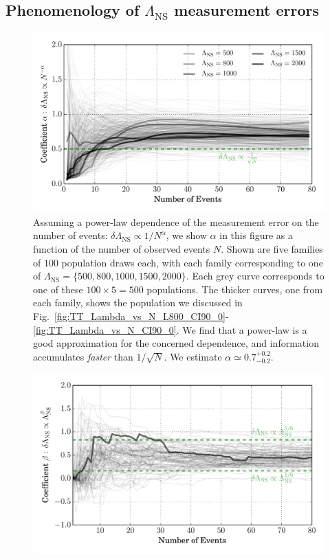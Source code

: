 \documentclass[aps,prd,amsmath,floats,floatfix, twocolumn,
superscriptaddress,nofootinbib,showpacs]{revtex4-1}
\newcommand{\lambdans}{\Lambda_\mathrm{NS}}
\begin{document}
\begin{appendix}
\section{Phenomenology of $\lambdans$ measurement errors}
% 
\begin{figure}
\centering    
\includegraphics[width=1.05\columnwidth]{PowerLawCoefficient_LambdaErrorvsN_vs_N.pdf}
\caption{%
Assuming a power-law dependence of the measurement error on the number of
events: $\delta\lambdans\propto 1/N^\alpha$, we show $\alpha$ in this figure
as a function of the number of observed events $N$. Shown are five families
of $100$ population draws each, with each family corresponding to one of
$\lambdans=\{500,800,1000,1500,2000\}$. Each grey curve corresponds to one
of these $100\times5 = 500$ populations. The thicker curves, one from each
family, shows the population we discussed in
Fig.~\ref{fig:TT_Lambda_vs_N_L800_CI90_0}-\ref{fig:TT_Lambda_vs_N_CI90_0}.
We find that a power-law is a good approximation for the concerned dependence,
and information accumulates {\it faster} than $1/\sqrt{N}$. We estimate
$\alpha\simeq 0.7^{+0.2}_{-0.2}$.
}
\label{fig:TT_PowerLawLambdaErrorVsN}
\end{figure}
%
% 
\begin{figure}
\centering    
\includegraphics[width=\columnwidth]{PowerLawCoefficient_LambdaErrorvsLambda_vs_N_AllPopulations.pdf}

\end{figure}
\end{appendix}
\end{document}
